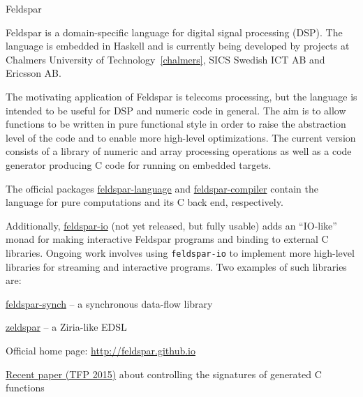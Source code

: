 \begin{hcarentry}[updated]{Feldspar}
\label{feldspar}
\makeheader

Feldspar is a domain-specific language for digital signal processing (DSP). The
language is embedded in Haskell and is currently being developed by projects at
Chalmers University of Technology~\cref{chalmers}, SICS Swedish ICT AB and
Ericsson AB.

The motivating application of Feldspar is telecoms processing, but the language
is intended to be useful for DSP and numeric code in general. The aim is to
allow functions to be written in pure functional style in order to raise the
abstraction level of the code and to enable more high-level optimizations. The
current version consists of a library of numeric and array processing operations
as well as a code generator producing C code for running on embedded targets.

The official packages
\href{http://hackage.haskell.org/package/feldspar-language}{feldspar-language}
and
\href{http://hackage.haskell.org/package/feldspar-compiler}{feldspar-compiler}
contain the language for pure computations and its C back end, respectively.

Additionally, \href{https://github.com/emilaxelsson/feldspar-io}{feldspar-io}
(not yet released, but fully usable) adds an ``IO-like'' monad for making
interactive Feldspar programs and binding to external C libraries. Ongoing
work involves using {\tt feldspar-io} to implement more high-level libraries
for streaming and interactive programs. Two examples of such libraries are:

\begin{compactitem}
\item \href{https://github.com/emilaxelsson/feldspar-synch}{feldspar-synch} -- a synchronous data-flow library
\item \href{https://github.com/koengit/zeldspar}{zeldspar} -- a Ziria-like EDSL
\end{compactitem}

\FurtherReading
\begin{compactitem}
\item Official home page: \url{http://feldspar.github.io}
\item \href{http://www.cse.chalmers.se/~emax/documents/persson2015programmable.pdf}{Recent paper (TFP 2015)} about controlling the signatures of generated C functions
\end{compactitem}
\end{hcarentry}
